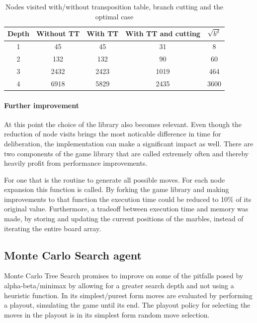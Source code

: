 \documentclass{llncs}
\begin{document}
\begin{table}
	\begin{center}
		\begin{tabular}{ | c | c | c | c | c | }
			\hline
			Depth & Without TT & With TT & With TT and cutting & $\sqrt{b^d}$ \\
			\hline
			1     & 45         & 45      & 31                  & 8            \\
			\hline
			2     & 132        & 132     & 90                  & 60           \\
			\hline
			3     & 2432       & 2423    & 1019                & 464          \\
			\hline
			4     & 6918       & 5829    & 2435                & 3600         \\
			\hline
		\end{tabular}
	\end{center}
	\caption{Nodes visited with/without transposition table, branch cutting and the optimal case}
	\label{node_count}
\end{table}

\paragraph{Further improvement}
At this point the choice of the library also becomes relevant. Even though the reduction of node visits brings the most noticable difference in time for deliberation, the implementation can make a significant impact as well. There are two components of the game library that are called extremely often and thereby heavily profit from performance improvements.

For one that is the routine to generate all possible moves. For each node expansion this function is called. By forking the game library \cite{campfireman_campfiremanabalone-boai_2021} and making improvements to that function the execution time could be reduced to 10\% of its original value. Furthermore, a tradeoff between execution time and memory was made, by storing and updating the current positions of the marbles, instead of iterating the entire board array.

\subsection{Monte Carlo Search agent}
Monte Carlo Tree Search promises to improve on some of the pitfalls posed by alpha-beta/minimax by allowing for a greater search depth and not using a heuristic function. In its simplest/purest form moves are evaluated by performing a playout, simulating the game until its end. The playout policy for selecting the moves in the playout is in its simplest form random move selection.
\end{document}
